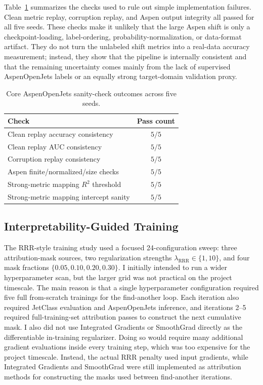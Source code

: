 Table~\ref{tab:aspen-sanity} summarizes the checks used to rule out simple implementation failures. Clean metric replay, corruption replay, and Aspen output integrity all passed for all five seeds. These checks make it unlikely that the large Aspen shift is only a checkpoint-loading, label-ordering, probability-normalization, or data-format artifact. They do not turn the unlabeled shift metrics into a real-data accuracy measurement; instead, they show that the pipeline is internally consistent and that the remaining uncertainty comes mainly from the lack of supervised AspenOpenJets labels or an equally strong target-domain validation proxy.

\begin{table}[t]
\centering
\caption{Core AspenOpenJets sanity-check outcomes across five seeds.}
\label{tab:aspen-sanity}
\begin{tabular}{lc}
\toprule
Check & Pass count \\
\midrule
Clean replay accuracy consistency & $5/5$ \\
Clean replay AUC consistency & $5/5$ \\
Corruption replay consistency & $5/5$ \\
Aspen finite/normalized/size checks & $5/5$ \\
Strong-metric mapping $R^2$ threshold & $5/5$ \\
Strong-metric mapping intercept sanity & $5/5$ \\
\bottomrule
\end{tabular}
\end{table}

\subsection{Interpretability-Guided Training}

The RRR-style training study used a focused 24-configuration sweep: three attribution-mask sources, two regularization strengths $\lambda_{\mathrm{RRR}}\in\{1,10\}$, and four mask fractions $\{0.05,0.10,0.20,0.30\}$. I initially intended to run a wider hyperparameter scan, but the larger grid was not practical on the project timescale. The main reason is that a single hyperparameter configuration required five full from-scratch trainings for the find-another loop. Each iteration also required JetClass evaluation and AspenOpenJets inference, and iterations 2--5 required full-training-set attribution passes to construct the next cumulative mask. I also did not use Integrated Gradients or SmoothGrad directly as the differentiable in-training regularizer. Doing so would require many additional gradient evaluations inside every training step, which was too expensive for the project timescale. Instead, the actual RRR penalty used input gradients, while Integrated Gradients and SmoothGrad were still implemented as attribution methods for constructing the masks used between find-another iterations.

